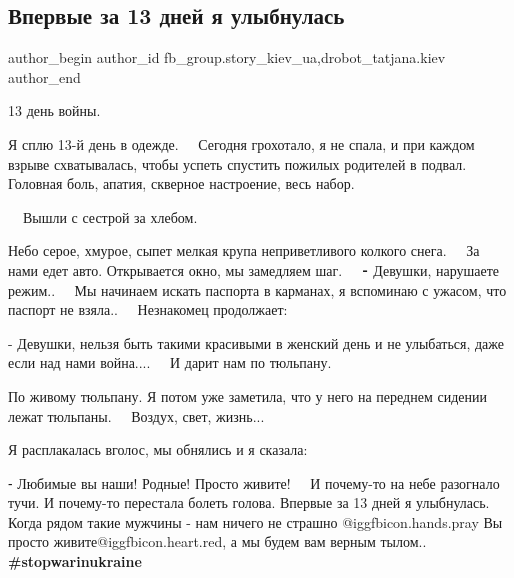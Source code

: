  
 
 
 
 
 
\subsection{Впервые за 13 дней я улыбнулась}
\label{sec:08_03_2022.fb.fb_group.story_kiev_ua.2.tulpany}
 
\ifcmt
 author_begin
   author_id fb_group.story_kiev_ua,drobot_tatjana.kiev
 author_end
\fi

13 день войны.

Я сплю 13-й день в одежде.
⠀
Сегодня грохотало, я не спала, и при каждом взрыве схватывалась, чтобы успеть
спустить пожилых родителей в подвал.
⠀
Головная боль, апатия, скверное настроение, весь набор.

⠀
Вышли с сестрой за хлебом.

Небо серое, хмурое, сыпет мелкая крупа неприветливого колкого снега.
⠀
За нами едет авто. Открывается окно, мы замедляем шаг.
⠀
⁃ Девушки, нарушаете режим..
⠀
Мы начинаем искать паспорта в карманах, я вспоминаю с ужасом, что паспорт не взяла..
⠀
Незнакомец продолжает:

- Девушки, нельзя быть такими красивыми в женский день и не улыбаться, даже если над нами война....
⠀
И дарит нам по тюльпану.

По живому тюльпану. Я потом уже заметила, что у него на переднем сидении лежат тюльпаны.
⠀
Воздух, свет, жизнь...

Я расплакалась вголос, мы обнялись и я сказала:

 ⁃ Любимые вы наши! Родные! Просто живите!
⠀
И почему-то на небе разогнало тучи.
И почему-то перестала болеть голова.
Впервые за 13 дней я улыбнулась.
⠀
Когда рядом такие мужчины - нам ничего не страшно @igg{fbicon.hands.pray} 
Вы просто живите@igg{fbicon.heart.red}, а мы будем вам верным тылом..
⠀
\textbf{\#stopwarinukraine}

